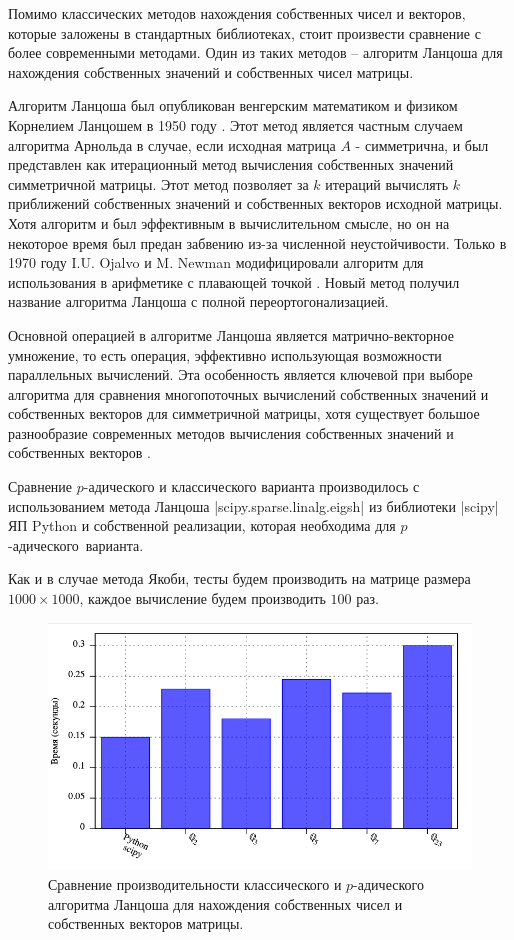 \documentclass[master, och, diploma, times]{sty/SCWorks}
\theoremstyle{plain}
\theoremstyle{definition}
\numberwithin{equation}{section}
\begin{document}
Помимо классических методов нахождения собственных чисел и векторов, которые заложены в стандартных библиотеках, стоит произвести сравнение с более современными методами. Один из таких методов  -- алгоритм Ланцоша для нахождения собственных значений и собственных чисел матрицы.

Алгоритм Ланцоша был опубликован венгерским математиком и физиком Корнелием Ланцошем в 1950 году \cite{bib:algebra:lanczos:1}. Этот метод является частным случаем алгоритма Арнольда в случае, если исходная матрица $A$ - симметрична, и был представлен как итерационный метод вычисления собственных значений симметричной матрицы. Этот метод позволяет за $k$ итераций вычислять $k$ приближений собственных значений и собственных векторов исходной матрицы. Хотя алгоритм и был эффективным в вычислительном смысле, но он на некоторое время был предан забвению из-за численной неустойчивости. Только в 1970 году I.U. Ojalvo и M. Newman модифицировали алгоритм для использования в арифметике с плавающей точкой \cite{bib:algebra:lanczos:2}. Новый метод получил название алгоритма Ланцоша с полной переортогонализацией.

Основной операцией в алгоритме Ланцоша является матрично-векторное умножение, то есть операция, эффективно использующая возможности параллельных вычислений. Эта особенность является ключевой при выборе алгоритма для сравнения многопоточных вычислений собственных значений и собственных векторов для симметричной матрицы, хотя существует большое разнообразие современных методов вычисления собственных значений и собственных векторов \cite{bib:algebra:eig:toolkit}.

Сравнение $p$-адического и классического варианта производилось с использованием метода Ланцоша |scipy.sparse.linalg.eigsh| из библиотеки |scipy| ЯП Python и собственной реализации, которая необходима для \mbox{$p$-адического варианта}.

Как и в случае метода Якоби, тесты будем производить на матрице размера $1000 \times 1000$, каждое вычисление будем производить $100$ раз.

\begin{figure}[H]
\centerline{\includegraphics[width=0.85\linewidth]{../gnuplot/multi/lanczos/plot.png}}
\caption{Сравнение производительности классического и $p$-адического алгоритма Ланцоша для нахождения собственных чисел и собственных векторов матрицы.}
\label{img:multi:lanczos}
\end{figure}
\end{document}
